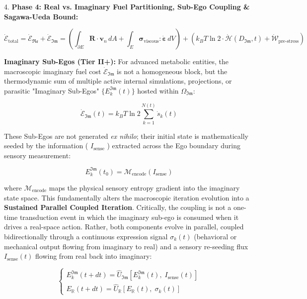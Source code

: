 \documentclass[11pt,a4paper]{article}
\theoremstyle{definition}
\theoremstyle{remark}
\begin{document}
4. \textbf{Phase 4: Real vs. Imaginary Fuel Partitioning, Sub-Ego Coupling \& Sagawa-Ueda Bound:}


\begin{equation}
\dot{\mathcal{E}}_{\text{total}} = \dot{\mathcal{E}}_{\mathfrak{Re}} + \dot{\mathcal{E}}_{\mathfrak{Im}} = \left( \int_{\partial E} \mathbf{R} \cdot \mathbf{v}_n \, dA + \int_E \boldsymbol{\sigma}_{\text{viscous}} : \dot{\boldsymbol{\varepsilon}} \, dV \right) + \left( k_B T \ln 2 \cdot \dot{\mathcal{H}}(D_{\mathfrak{Im}}, t) + \dot{\mathcal{W}}_{\text{pre-stress}} \right)
\end{equation}


\textbf{Imaginary Sub-Egos (Tier II+):} For advanced metabolic entities, the macroscopic imaginary fuel cost $\dot{\mathcal{E}}_{\mathfrak{Im}}$ is not a homogeneous block, but the thermodynamic sum of multiple active internal simulations, projections, or parasitic "Imaginary Sub-Egos" $\{E_k^{\mathfrak{Im}}(t)\}$ hosted within $\Omega_{\mathfrak{Im}}$:


\begin{equation}
\boxed{\dot{\mathcal{E}}_{\mathfrak{Im}}(t) = k_B T \ln 2 \sum_{k=1}^{N(t)} \dot{s}_k(t)}
\end{equation}


These Sub-Egos are not generated \textit{ex nihilo}; their initial state is mathematically seeded by the information ( $I_{\text{sense}}$ ) extracted across the Ego boundary during sensory measurement:


\begin{equation}
\boxed{E_k^{\mathfrak{Im}}(t_0) = \mathcal{M}_{\text{encode}}(I_{\text{sense}})}
\end{equation}


where $\mathcal{M}_{\text{encode}}$ maps the physical sensory entropy gradient into the imaginary state space.
This fundamentally alters the macroscopic iteration evolution into a \textbf{Sustained Parallel Coupled Iteration}. Critically, the coupling is not a one-time transduction event in which the imaginary sub-ego is consumed when it drives a real-space action. Rather, both components evolve in parallel, coupled bidirectionally through a continuous expression signal $\sigma_k(t)$ (behavioral or mechanical output flowing from imaginary to real) and a sensory re-seeding flux $I_{\text{sense}}(t)$ flowing from real back into imaginary:


\begin{equation}
\boxed{\begin{cases} E_k^{\mathfrak{Im}}(t+dt) = \hat{U}_{\mathfrak{Im}}\!\left[E_k^{\mathfrak{Im}}(t),\; I_{\text{sense}}(t)\right] \\[6pt] E_{\mathbb{R}}(t+dt) = \hat{U}_{\mathbb{R}}\!\left[E_{\mathbb{R}}(t),\; \sigma_k(t)\right] \end{cases}}
\end{equation}
\end{document}
